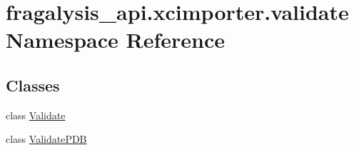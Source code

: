 \hypertarget{namespacefragalysis__api_1_1xcimporter_1_1validate}{}\section{fragalysis\+\_\+api.\+xcimporter.\+validate Namespace Reference}
\label{namespacefragalysis__api_1_1xcimporter_1_1validate}
\subsection*{Classes}
\begin{DoxyCompactItemize}
\item 
class \hyperlink{classfragalysis__api_1_1xcimporter_1_1validate_1_1_validate}{Validate}
\item 
class \hyperlink{classfragalysis__api_1_1xcimporter_1_1validate_1_1_validate_p_d_b}{Validate\+P\+DB}
\end{DoxyCompactItemize}
